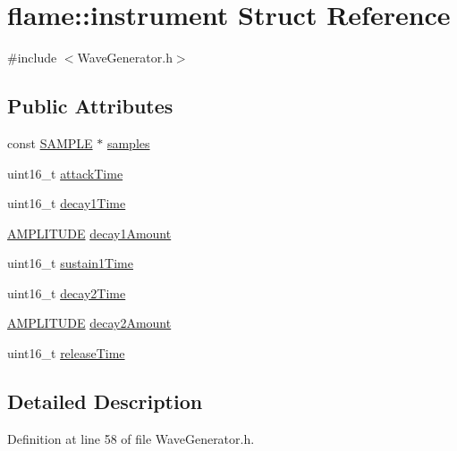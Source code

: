 \hypertarget{structflame_1_1instrument}{\section{flame\-:\-:instrument Struct Reference}
\label{structflame_1_1instrument}
}


{\ttfamily \#include $<$Wave\-Generator.\-h$>$}

\subsection*{Public Attributes}
\begin{DoxyCompactItemize}
\item 
const \hyperlink{_d_a_c_8h_a5a6d1dc37ffa32957a63868cd1da39b3}{S\-A\-M\-P\-L\-E} $\ast$ \hyperlink{structflame_1_1instrument_ad8ca175683ca6f0ebd472cf13051929f}{samples}
\item 
uint16\-\_\-t \hyperlink{structflame_1_1instrument_a9e8428ddc6afef3392234e1ed89bd442}{attack\-Time}
\item 
uint16\-\_\-t \hyperlink{structflame_1_1instrument_ad683abcb6de0196805bd230a2d59fb85}{decay1\-Time}
\item 
\hyperlink{namespaceflame_a7f6447252c60127b805475b293831f99}{A\-M\-P\-L\-I\-T\-U\-D\-E} \hyperlink{structflame_1_1instrument_a0a0e0263483ad2e903cbcb854493bc1b}{decay1\-Amount}
\item 
uint16\-\_\-t \hyperlink{structflame_1_1instrument_a5214632ee985002310d9c94431f5391f}{sustain1\-Time}
\item 
uint16\-\_\-t \hyperlink{structflame_1_1instrument_a31be3cd286103e4364edf36133aeec14}{decay2\-Time}
\item 
\hyperlink{namespaceflame_a7f6447252c60127b805475b293831f99}{A\-M\-P\-L\-I\-T\-U\-D\-E} \hyperlink{structflame_1_1instrument_a294a5d9d9d10c3706d2fe362e31fc93c}{decay2\-Amount}
\item 
uint16\-\_\-t \hyperlink{structflame_1_1instrument_a40807d7de06391d048f1fff8cfe98964}{release\-Time}
\end{DoxyCompactItemize}


\subsection{Detailed Description}


Definition at line 58 of file Wave\-Generator.\-h.




